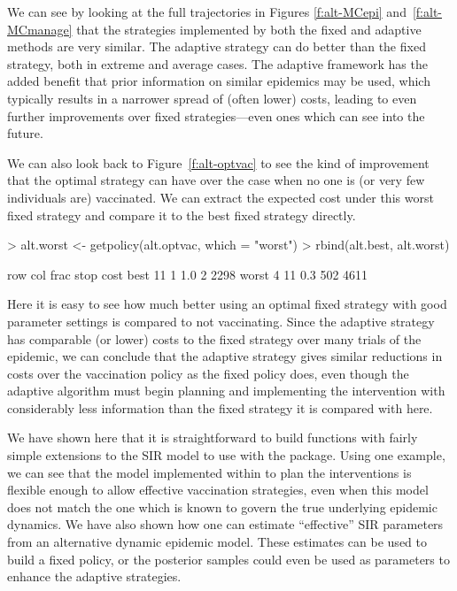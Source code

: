 \documentclass[shortnames,nojss]{jss}
\begin{document}
We can see by looking at the full trajectories in Figures
\ref{f:alt-MCepi} and~\ref{f:alt-MCmanage} that the strategies
implemented by both the fixed and adaptive methods are very
similar. The adaptive strategy can do better than the
fixed strategy, both in extreme and average cases. The adaptive framework
has the added benefit that prior information on similar epidemics
may be used, which typically results in a narrower spread of
(often lower) costs, leading to even further improvements over
fixed strategies---even ones which can see into the future.

We can also look back to Figure~\ref{f:alt-optvac} to see the kind of
improvement that the optimal strategy can have over the case when no
one is (or very few individuals are) vaccinated. We can extract the
expected cost under this worst fixed strategy and compare it to the
best fixed strategy directly.
\begin{Schunk}
\begin{Sinput}
> alt.worst <- getpolicy(alt.optvac, which = "worst")
> rbind(alt.best, alt.worst)
\end{Sinput}
\begin{Soutput}
      row col frac stop cost
best   11   1  1.0    2 2298
worst   4  11  0.3  502 4611
\end{Soutput}
\end{Schunk}
Here it is easy to see how much better using an optimal fixed
strategy with good parameter settings is compared to not
vaccinating. Since the adaptive strategy has comparable (or lower)
costs to the fixed strategy over many trials of the epidemic, we can
conclude that the adaptive strategy gives similar reductions in costs
over the  vaccination policy as the fixed policy does, even
though the adaptive algorithm must begin planning and implementing the
intervention with considerably less information than the fixed
strategy it is compared with here.

We have shown here that it is straightforward to build functions with
fairly simple extensions to the SIR model to use with the 
package. Using one example, we can see that the model implemented
within  to plan the interventions is flexible enough to
allow effective vaccination strategies, even when this model does not
match the one which is known to govern the true underlying epidemic
dynamics. We have also shown how one can estimate ``effective'' SIR
parameters from an alternative dynamic epidemic model. These estimates
can be used to build a fixed policy, or the posterior samples could
even be used as parameters to enhance the adaptive strategies.
\end{document}

